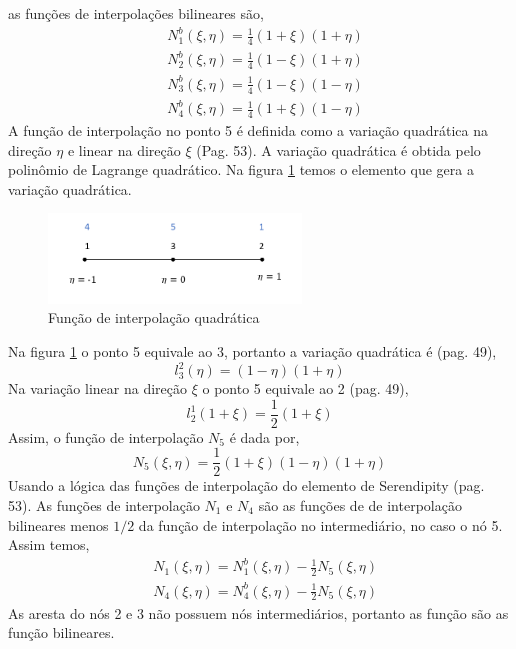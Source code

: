 %
as funções de interpolações bilineares são,
%
\begin{equation}
	\begin{split}
		&N^b_1(\xi, \eta) = \frac{1}{4}(1 + \xi)(1 + \eta)\\
		&N^b_2(\xi, \eta) = \frac{1}{4}(1 - \xi)(1 + \eta)\\
		&N^b_3(\xi, \eta) = \frac{1}{4}(1 - \xi)(1 - \eta)\\
		&N^b_4(\xi, \eta) = \frac{1}{4}(1 + \xi)(1 - \eta)
	\end{split}
\end{equation}
%
A função de interpolação no ponto 5 é definida como a variação quadrática na direção $\eta$ e linear na direção $\xi$ (Pag. 53). A variação quadrática é obtida pelo polinômio de Lagrange quadrático. Na figura \ref{cap6:Quadratico} temos o elemento que gera a variação quadrática.
%
\begin{figure}[H]
	\includegraphics[width=0.6\textwidth,center]{fig/elemento_quad.PNG}
	\caption{Função de interpolação quadrática} 
	\label{cap6:Quadratico}
\end{figure}
%

Na figura \ref{cap6:Quadratico} o ponto 5 equivale ao 3, portanto a variação quadrática é (pag. 49),
%
\begin{equation}
	l^2_3(\eta) = (1-\eta)(1+\eta)
\end{equation}
%
Na variação linear na direção $\xi$ o ponto 5 equivale ao 2 (pag. 49),
%
\begin{equation}
	l^1_2(1+\xi) = \frac{1}{2}(1+\xi)
\end{equation}
%
Assim, o função de interpolação $N_5$ é dada por,
%
\begin{equation}
	N_5(\xi,\eta) = \frac{1}{2}(1+\xi)(1-\eta)(1+\eta)
\end{equation}
%
Usando a lógica das funções de interpolação do elemento de Serendipity (pag. 53). As  funções de interpolação $N_1$ e $N_4$ são as funções de de interpolação bilineares menos ${1/2}$ da função de interpolação no intermediário, no caso o nó 5. Assim temos,
%
\begin{equation}
	\begin{split}
	&N_1(\xi,\eta) = N^b_1(\xi,\eta) - \frac{1}{2}  N_5(\xi,\eta)\\
	&N_4(\xi,\eta) = N^b_4(\xi,\eta) - \frac{1}{2}  N_5(\xi,\eta)
	\end{split}
\end{equation}
%	
As aresta do nós 2 e 3 não possuem nós intermediários, portanto as função são as função bilineares. 

